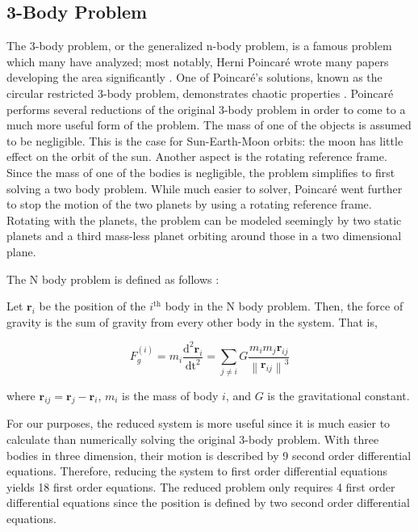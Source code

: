 \documentclass{article}
\begin{document}
\subsection{3-Body Problem}

The 3-body problem, or the generalized n-body problem, is a famous problem
which many have analyzed; most notably, Herni Poincaré wrote many papers
developing the area significantly \cite{chenciner2000remarkable}. One of
Poincaré's solutions, known as the circular restricted 3-body problem,
demonstrates chaotic properties \cite{oestreicher2007history}. Poincaré
performs several reductions of the original 3-body problem in order to come
to a much more useful form of the problem. The mass of one of the objects is
assumed to be negligible. This is the case for Sun-Earth-Moon orbits: the
moon has little effect on the orbit of the sun. Another aspect is the
rotating reference frame. Since the mass of one of the bodies is negligible,
the problem simplifies to first solving a two body problem. While much easier
to solver, Poincaré went further to stop the motion of the two planets by
using a rotating reference frame. Rotating with the planets, the problem can
be modeled seemingly by two static planets and a third mass-less planet
orbiting around those in a two dimensional plane.

\newcommand{\norm}[1]{\left\lVert#1\right\rVert}
\newcommand{\rv}{\mathbf{r}}

The N body problem is defined as follows \cite{chenciner2000remarkable}:

Let $\rv_i$ be the position of the $i^\text{th}$ body in the N body problem.
Then, the force of gravity is the sum of gravity from every other body in the
system. That is,

\begin{equation}
   F_g^{(i)} = m_i \frac{\mathrm{d}^2 \rv_i}{\mathrm{dt}^2} =
   \sum_{j \neq i} G \frac{m_i m_j \rv_{ij}}{\norm{\rv_{ij}}^3}
   \label{eq:nbody}
\end{equation}

where $\rv_{ij} = \rv_j - \rv_i$, $m_i$ is the mass of body $i$, and $G$ is
the gravitational constant.

For our purposes, the reduced system is more useful since it is much easier
to calculate than numerically solving the original 3-body problem. With three
bodies in three dimension, their motion is described by 9 second order
differential equations. Therefore, reducing the system to first order
differential equations yields 18 first order equations. The reduced problem
only requires 4 first order differential equations since the position is
defined by two second order differential equations.
\end{document}
